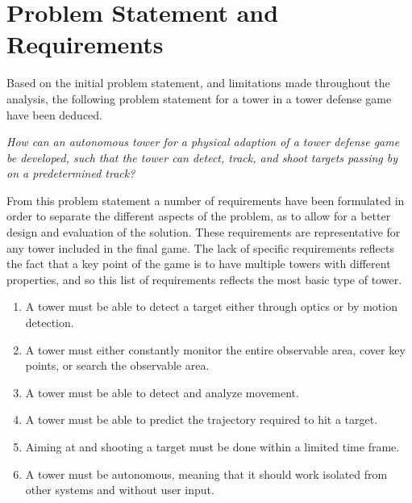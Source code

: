 \section{Problem Statement and Requirements}\label{sec:requirements}
Based on the initial problem statement, and limitations made throughout the analysis, the following problem statement for a tower in a tower defense game have been deduced.

\begin{center}\textit{How can an autonomous tower for a physical adaption of a tower defense game be developed, such that the tower can detect, track, and shoot targets passing by on a predetermined track?}\end{center}

From this problem statement a number of requirements have been formulated in order to separate the different aspects of the problem, as to allow for a better design and evaluation of the solution. These requirements are representative for any tower included in the final game. The lack of specific requirements reflects the fact that a key point of the game is to have multiple towers with different properties, and so this list of requirements reflects the most basic type of tower. \\

\begin{enumerate}
    \item \label{list:vis}A tower must be able to detect a target either through optics or by motion detection.\\
    
    \item A tower must either constantly monitor the entire observable area, cover key points, or search the observable area.\\
    
    \item A tower must be able to detect and analyze movement.\\
    
    \item A tower must be able to predict the trajectory required to hit a target.\\
    
    \item Aiming at and shooting a target must be done within a limited time frame.\\
    
    \item A tower must be autonomous, meaning that it should work isolated from other systems and without user input.
\end{enumerate}

